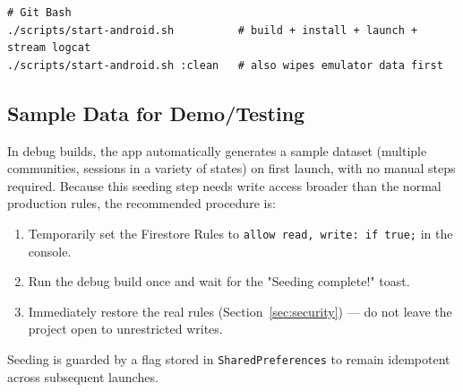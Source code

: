 \begin{verbatim}
# Git Bash
./scripts/start-android.sh          # build + install + launch + stream logcat
./scripts/start-android.sh :clean   # also wipes emulator data first
\end{verbatim}

\subsection{Sample Data for Demo/Testing}

In debug builds, the app automatically generates a sample dataset (multiple communities, sessions in a variety of states) on first launch, with no manual steps required. Because this seeding step needs write access broader than the normal production rules, the recommended procedure is:

\begin{enumerate}
    \item Temporarily set the Firestore Rules to \texttt{allow read, write: if true;} in the console.
    \item Run the debug build once and wait for the "Seeding complete!" toast.
    \item Immediately restore the real rules (Section~\ref{sec:security}) — do not leave the project open to unrestricted writes.
\end{enumerate}

Seeding is guarded by a flag stored in \texttt{SharedPreferences} to remain idempotent across subsequent launches.
